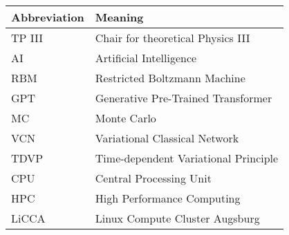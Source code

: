 \noindent\\\\

\begin{tabular}[h]{p{3cm}|l}
	Abbreviation & Meaning\\
	\midrule 
	TP III & Chair for theoretical Physics III\\
	AI & Artificial Intelligence\\
	RBM & Restricted Boltzmann Machine\\ 
	GPT & Generative Pre-Trained Transformer\\
	MC & Monte Carlo\\
	VCN & Variational Classical Network\\ 
	TDVP & Time-dependent Variational Principle\\ 
	CPU & Central Processing Unit \\
	HPC & High Performance Computing\\ 
	LiCCA & Linux Compute Cluster Augsburg\\ 
\end{tabular}\\\\

\newpage